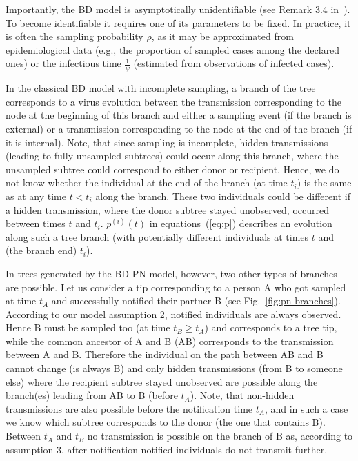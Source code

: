 \documentclass[a4paper,10pt]{article}
\begin{document}
Importantly, the BD model is asymptotically unidentifiable (see Remark 3.4 in~\citep{Stadler2009}). To become identifiable it requires one of its parameters to be fixed. In practice, it is often the sampling probability $\rho$, as it may be approximated from epidemiological data (e.g., the proportion of sampled cases among the declared ones) or the infectious time $\frac{1}{\psi}$ (estimated from observations of infected cases). 



In the classical BD model with incomplete sampling, a branch of the tree corresponds to a virus evolution between the transmission corresponding to the node at the beginning of this branch and either a sampling event (if the branch is external) or a transmission corresponding to the node at the end of the branch (if it is internal). Note, that since sampling is incomplete, hidden transmissions (leading to fully unsampled subtrees) could occur along this branch, where the unsampled subtree could correspond to either donor or recipient.  Hence, we do not know whether the individual at the end of the branch (at time $t_i$) is the same as at any time $t < t_i$ along the branch. These two individuals could be different if a hidden transmission, where the donor subtree stayed unobserved, occurred between times $t$ and $t_i$. $p^{(i)}(t)$ in equations~(\ref{eq:p}) describes an evolution along such a tree branch (with potentially different individuals at times $t$ and (the branch end) $t_i$).

In trees generated by the BD-PN model, however, two other types of branches are possible. Let us consider a tip corresponding to a person A who got sampled at time $t_A$ and successfully notified their partner B (see Fig.~\ref{fig:pn-branches}). According to our model assumption 2, notified individuals are always observed. Hence B must be sampled too (at time $t_B \geq t_A$) and corresponds to a tree tip, while the common ancestor of A and B (AB) corresponds to the transmission between A and B. Therefore the individual on the path between AB and B cannot change (is always B) and only hidden transmissions (from B to someone else) where the recipient subtree stayed unobserved are possible along the branch(es) leading from AB to B (before $t_A$). Note, that non-hidden transmissions are also possible before the notification time $t_A$, and in such a case we know which subtree corresponds to the donor (the one that contains B). Between $t_A$ and $t_B$ no transmission is possible on the branch of B as, according to assumption 3, after notification notified individuals do not transmit further.
\end{document}
